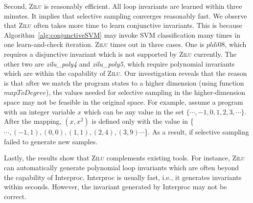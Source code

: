 Second, \textsc{Zilu} is reasonably efficient. All loop invariants are learned within three minutes. It implies that selective sampling converges reasonably fast.
We observe that \textsc{Zilu} often takes more time to learn conjunctive invariants. This is because Algorithm~\ref{alg:conjunctiveSVM} may invoke SVM classification many times in one learn-and-check iteration.
\textsc{Zilu} times out in three cases. One is $pldi08$, which requires a disjunctive invariant which is not supported by \textsc{Zilu} currently. The other two are \emph{zilu\_poly4} and \emph{zilu\_poly5}, which require polynomial invariants which are within the capability of \textsc{Zilu}. Our investigation reveals that the reason is that after we match the program states to a higher dimension (using function $mapToDegree$), the values needed for selective sampling in the higher-dimension space may not be feasible in the original space. For example, assume a program with an integer variable $x$ which can be any value in the set $\{\cdots, -1, 0,  1, 2, 3, \cdots\}$. After the mapping, $(x, x^2)$ is defined only with the value in \{$\cdots, (-1,1), (0,0), (1,1), (2, 4), (3, 9)\cdots$\}. As a result, if selective sampling failed to generate new samples.

Lastly, the results show that \textsc{Zilu} complements existing tools. For instance, \textsc{Zilu} can automatically generate polynomial loop invariants
which are often beyond the capability of Interproc. Interproc is usually fast, i.e., it generates invariants within seconds. However, the invariant generated by Interproc may not be correct.


